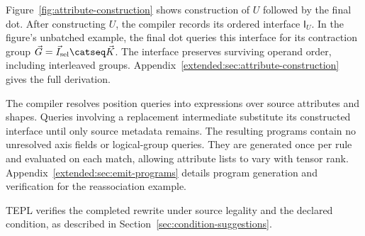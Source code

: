 Figure~\ref{fig:attribute-construction} shows construction of $U$ followed
by the final dot. After constructing $U$, the compiler records its ordered
interface $\mathsf I_U$. In the figure's unbatched example, the final dot
queries this interface for its contraction group
$\vec G=\vec I_{\mathrm{sel}}\catseq\vec K$.
The interface preserves surviving operand order, including interleaved groups.
Appendix~\ref{extended:sec:attribute-construction} gives the full derivation.

The compiler resolves position queries into expressions over source
attributes and shapes. Queries involving a replacement intermediate
substitute its constructed interface until only source metadata remains.
The resulting programs contain no unresolved axis fields or logical-group
queries. They are generated once per rule and evaluated on each match,
allowing attribute lists to vary with tensor rank.
Appendix~\ref{extended:sec:emit-programs} details program generation
and verification for the reassociation example.

TEPL verifies the completed rewrite under source legality and the
declared  condition, as described in
Section~\ref{sec:condition-suggestions}.
